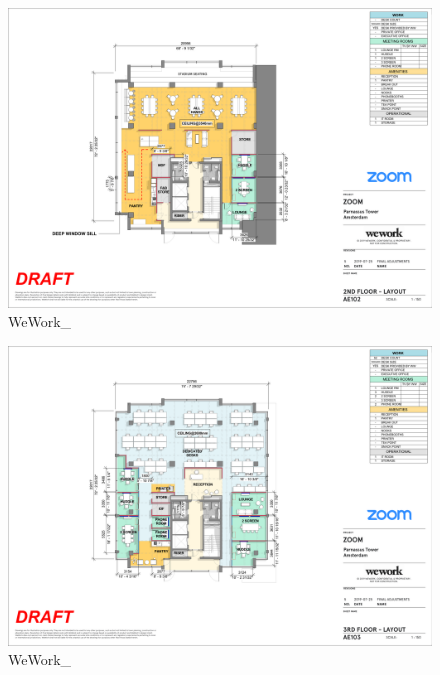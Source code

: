 \documentclass[
]{article}
\begin{document}
\begin{figure}[H]

{\centering \includegraphics{assets/WeWork/ww-parnassus-2.png}

}

\caption{WeWork\_}

\end{figure}%
\begin{figure}[H]

{\centering \includegraphics{assets/WeWork/ww-parnassus-3.png}

}

\caption{WeWork\_}

\end{figure}%
\end{document}
